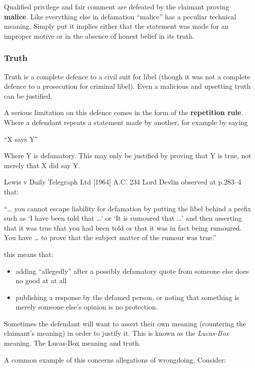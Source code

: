 \documentclass[]{article}
\begin{document}
{{Qualified privilege and fair comment are defeated by the claimant
proving }}{\textbf{malice}}{{. Like everything else in defamation
``malice'' has a peculiar technical meaning. Simply put it implies
either that the statement was made for an improper motive or in the
absence of honest belief in its truth.}}

\subsubsection{Truth}

Truth is a complete defence to a civil suit for libel (though it was not
a complete defence to a prosecution for criminal libel). Even a
malicious and upsetting truth can be justified.

{{A serious limitation on this defence comes in the form of the
}}{\textbf{repetition rule}}{{. Where a defendant repeats a statement
made by another, for example by saying }}

``X says Y''

Where Y is defamatory. This may only be justified by proving that Y is
true, not merely that X did say Y.

Lewis v Daily Telegraph Ltd {[}1964{]} A.C. 234 Lord Devlin observed at
p.283--4 that:

``\ldots{} you cannot escape liability for defamation by putting the
libel behind a prefix such as `I have been told that \ldots{}' or `It is
rumoured that \ldots{}' and then asserting that it was true that you had
been told or that it was in fact being rumoured. You have \ldots{} to
prove that the subject matter of the rumour was true.''

this means that:

\begin{itemize}
\item
  adding ``allegedly'' after a possibly defamatory quote from someone
  else does no good at at all
\item
  publishing a response by the defamed person, or noting that something
  is merely someone else's opinion is no protection.
\end{itemize}

{{Sometimes the defendant will want to assert their own meaning
(countering the claimant's meaning) in order to justify it. This is
known as the }}\emph{{Lucas-Box}}{{ meaning. The Lucas-Box meaning and
truth. }}

A common example of this concerns allegations of wrongdoing. Consider:
\end{document}
